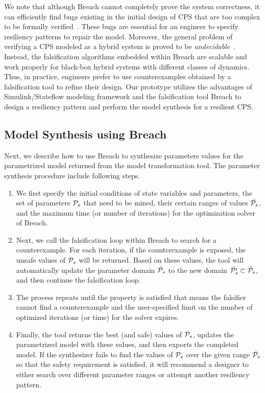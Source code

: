 We note that although Breach cannot completely prove the system correctness, it can efficiently find bugs existing in the initial design of CPS that are too complex to be formally verified~\cite{kapinski2015simulation}. These bugs are essential for an engineer to specify resiliency patterns to repair the model. 
%
Moreover, the general problem of verifying a CPS modeled as a hybrid system is proved to be \emph{undecidable}~\cite{henzinger1995s}. 
%
Instead, the falsification algorithms embedded within Breach are scalable and work properly for black-box hybrid systems with different classes of dynamics.
%
Thus, in practice, engineers prefer to use counterexamples obtained by a falsification tool to refine their design. Our prototype \toolreaffirm utilizes the advantages of Simulink/Stateflow modeling framework and the falsification tool Breach to design a resiliency pattern and perform the model synthesis for a resilient CPS.
%
\subsection{Model Synthesis using Breach}
Next, we describe how to use Breach to synthesize parameters values for the parametrized model returned from the model transformation tool. The parameter synthesis procedure include following steps.

\begin{enumerate}[leftmargin= 2 em]
\item We first specify the initial conditions of state variables and parameters, the set of parameters $\P_s$ that need to be mined, their certain ranges of values $\bar{\P_s}$, and the maximum time (or number of iterations) for the optimization solver of Breach.
\item Next, we call the falsification loop within Breach to search for a counterexample. For each iteration, if the counterexample is exposed, the unsafe values of $\P_s$ will be returned. Based on these values, the tool will automatically update the parameter domain $\bar{\P_s}$ to the new domain $\bar{\P'_s} \subset \bar{\P_s}$, and then continue the falsification loop.
\item The process repeats until the property is satisfied that means the falsifier cannot find a counterexample and the user-specified limit on the number of optimized iterations (or time) for the solver expires.  
\item Finally, the tool returns the best (and safe) values of $\P_s$, updates the parametrized model with these values, and then exports the completed model. If the synthesizer fails to find the values of $\P_s$ over the given range $\bar{\P_s}$ so that the safety requirement is satisfied, it will recommend a designer to either search over different parameter ranges or attempt another resiliency pattern.
\end{enumerate}

